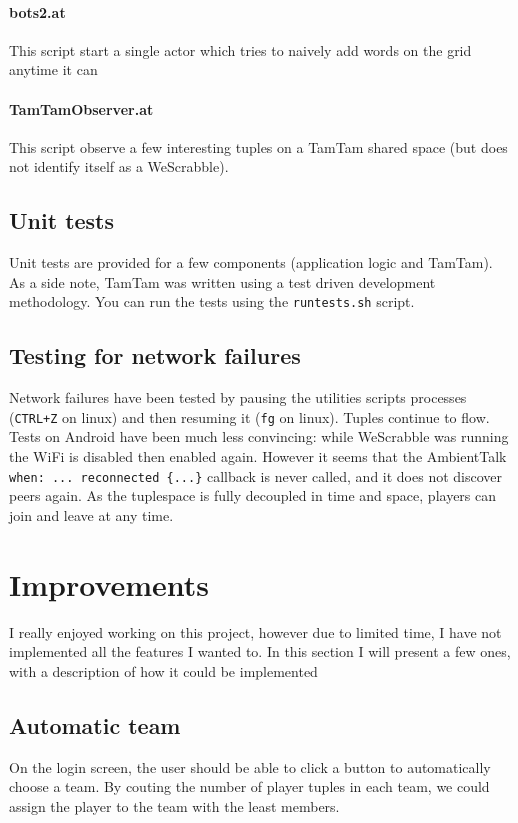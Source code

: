 \documentclass[a4paper,12pt]{article}
\begin{document}
\paragraph{bots2.at} This script start a single actor which tries to naively add words on the grid anytime it can

\paragraph{TamTamObserver.at} This script observe a few interesting tuples on a TamTam shared space (but does not identify itself as a WeScrabble).

\subsection{Unit tests}
Unit tests are provided for a few components (application logic and TamTam). As a side note, TamTam was written using a test driven development methodology. You can run the tests using the \texttt{runtests.sh} script.

\subsection{Testing for network failures}
Network failures have been tested by pausing the utilities scripts processes (\texttt{CTRL+Z} on linux) and then resuming it (\texttt{fg} on linux). Tuples continue to flow. Tests on Android have been much less convincing: while WeScrabble was running the WiFi is disabled then enabled again. However it seems that the AmbientTalk \texttt{when: ... reconnected \{...\}} callback is never called, and it does not discover peers again. As the tuplespace is fully decoupled in time and space, players can join and leave at any time.

\section{Improvements}
I really enjoyed working on this project, however due to limited time, I have not implemented all the features I wanted to. In this section I will present a few ones, with a description of how it could be implemented

\subsection{Automatic team}
On the login screen, the user should be able to click a button to automatically choose a team. By couting the number of player tuples in each team, we could assign the player to the team with the least members.
\end{document}
